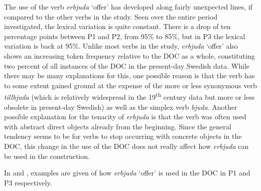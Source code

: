 \documentclass[output=paper]{langscibook}
\begin{document}
\label{sec:valdeson:5.3.3.2}



The use of the verb \textit{erbjuda} ‘offer’ has developed along fairly unexpected lines, if compared to the other verbs in the study. Seen over the entire period investigated, the lexical variation is quite constant. There is a drop of ten percentage points between P1 and P2, from 95\% to 85\%, but in P3 the lexical variation is back at 95\%. Unlike most verbs in the study, \textit{erbjuda} ‘offer’ also shows an increasing token frequency relative to the DOC as a whole, constituting two percent of all instances of the DOC in the present-day Swedish data. While there may be many explanations for this, one possible reason is that the verb has to some extent gained ground at the expense of the more or less synonymous verb \textit{tillbjuda} (which is relatively widespread in the 19\textsuperscript{th} century data but more or less obsolete in present-day Swedish) as well as the simplex verb \textit{bjuda}. Another possible explanation for the tenacity of \textit{erbjuda} is that the verb was often used with abstract direct objects already from the beginning. Since the general tendency seems to be for verbs to stop occurring with concrete objects in the DOC, this change in the use of the DOC does not really affect how \textit{erbjuda} can be used in the construction.


\begin{table}
\caption{Frequency measures of the verb-specific DOC with \textit{erbjuda} ‘offer’}
\label{tab:valdeson:15}
\end{table}

In  and , examples are given of how \textit{erbjuda} ‘offer’ is used in the DOC in P1 and P3 respectively.
\end{document}
